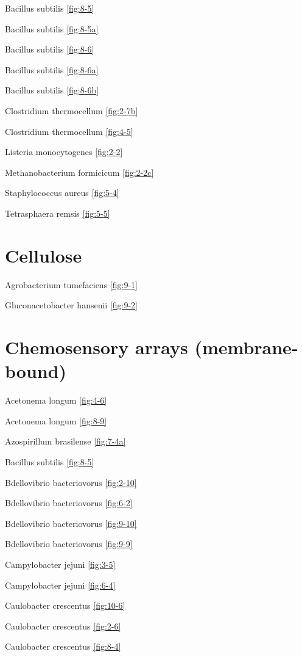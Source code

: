 \documentclass[]{tufte-book}
\begin{document}
Bacillus subtilis \ref{fig:8-5}

Bacillus subtilis \ref{fig:8-5a}

Bacillus subtilis \ref{fig:8-6}

Bacillus subtilis \ref{fig:8-6a}

Bacillus subtilis \ref{fig:8-6b}

Clostridium thermocellum \ref{fig:2-7b}

Clostridium thermocellum \ref{fig:4-5}

Listeria monocytogenes \ref{fig:2-2}

Methanobacterium formicicum \ref{fig:2-2c}

Staphylococcus aureus \ref{fig:5-4}

Tetrasphaera remsis \ref{fig:5-5}

\section*{Cellulose}\label{cellulose}

Agrobacterium tumefaciens \ref{fig:9-1}

Gluconacetobacter hansenii \ref{fig:9-2}

\section*{Chemosensory arrays
(membrane-bound)}\label{chemosensory-arrays-membrane-bound}

Acetonema longum \ref{fig:4-6}

Acetonema longum \ref{fig:8-9}

Azospirillum brasilense \ref{fig:7-4a}

Bacillus subtilis \ref{fig:8-5}

Bdellovibrio bacteriovorus \ref{fig:2-10}

Bdellovibrio bacteriovorus \ref{fig:6-2}

Bdellovibrio bacteriovorus \ref{fig:9-10}

Bdellovibrio bacteriovorus \ref{fig:9-9}

Campylobacter jejuni \ref{fig:3-5}

Campylobacter jejuni \ref{fig:6-4}

Caulobacter crescentus \ref{fig:10-6}

Caulobacter crescentus \ref{fig:2-6}

Caulobacter crescentus \ref{fig:8-4}
\end{document}
